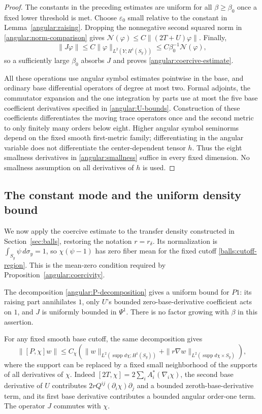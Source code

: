 \documentclass[11pt]{article}
\theoremstyle{definition}
\theoremstyle{remark}
\newcommand{\eps}{\varepsilon}
\DeclareMathOperator{\supp}{supp}
\numberwithin{equation}{section}
\begin{document}
\begin{proof}
The constants in the preceding estimates are uniform for all
$\beta\ge\beta_0$ once a fixed lower threshold is met.  Choose
$\eps_0$ small relative to the constant in
Lemma~\ref{angular:raising}.  Dropping the nonnegative second squared
norm in \eqref{angular:norm-comparison} gives
$\mathcal N(\varphi)\le C\|(2T+U)\varphi\|$.
Finally,
\[
 \|J\varphi\|\le C\|\varphi\|_{L^2(Y;H^1(S_y))}
                         \le C\beta_0^{-1}\mathcal N(\varphi),
\]
so a sufficiently large $\beta_0$ absorbs $J$ and proves
\eqref{angular:coercive-estimate}.

All these operations use angular symbol estimates pointwise in the base,
and ordinary base differential operators of degree at most two.  Formal
adjoints, the commutator expansion and the one integration by parts use
at most the five base coefficient derivatives specified in
\eqref{angular:U-bounds}.  Construction of these coefficients differentiates
the moving trace operators once and the second metric to only finitely
many orders below eight.  Higher angular symbol seminorms depend on the
fixed smooth first-metric family; differentiating in the angular variable
does not differentiate the center-dependent tensor $h$.  Thus the eight
smallness derivatives in \eqref{angular:smallness} suffice in every fixed
dimension.  No smallness assumption on all derivatives of $h$ is used.
\end{proof}

\subsection{The constant mode and the uniform density bound}

We now apply the coercive estimate to the transfer density constructed in
Section~\ref{sec:balls}, restoring the notation $r=r_\delta$.
Its normalization is $\int_{S_y}\psi\,d\sigma_y=1$, so
$\chi(\psi-1)$ has zero fiber mean for the fixed cutoff
\eqref{balls:cutoff-region}.  This is the mean-zero condition required
by Proposition~\ref{angular:coercivity}.

The decomposition \eqref{angular:P-decomposition} gives a uniform
bound for $P1$: its raising part annihilates $1$, only $U$'s bounded
zero-base-derivative coefficient acts on $1$, and $J$ is uniformly
bounded in $\Psi^1$.  There is no factor growing with $\beta$ in this
assertion.

For any fixed smooth base cutoff, the same decomposition gives
\begin{equation}\label{angular:cutoff-bound}
 \|[P,\chi]w\|
 \le C_\chi\left(
  \|w\|_{L^2(\supp d\chi;H^1(S_y))}
    +\|r\nabla w\|_{L^2(\supp d\chi\times S_y)}\right),
\end{equation}
where the support can be replaced by a fixed small neighborhood of the
supports of all derivatives of $\chi$.
Indeed $[2T,\chi]=2\sum_iA_i^*(\nabla_i\chi)$, the second base derivative
of $U$ contributes $2rQ^{ij}(\partial_i\chi)\partial_j$ and a bounded
zeroth-base-derivative term, and its first base derivative contributes a
bounded angular order-one term.  The operator $J$ commutes with $\chi$.
\end{document}
